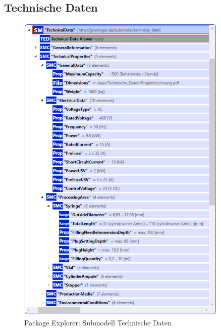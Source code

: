 \newpage
\subsection{Technische Daten}
\begin{figure}[H]
    \centering
    \includegraphics[width=0.9\textwidth]{Bilder/ErgebnissePackageExplorer/TehcnischeDaten.PNG}
    \caption{Package Explorer: Submodell Technische Daten}
\end{figure}

\newpage
